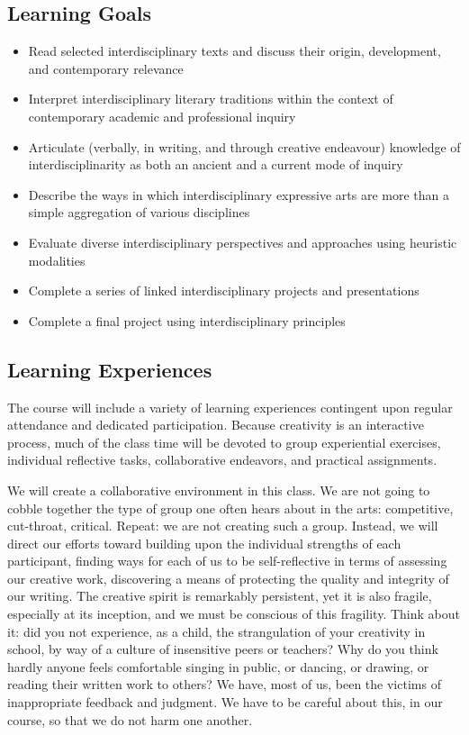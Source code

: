 \documentclass[letterpaper,10pt,headsepline]{scrreprt}
\begin{document}
\subsection{Learning Goals}
\begin{itemize}

\item Read selected interdisciplinary texts and discuss their origin, development, and contemporary relevance
\item Interpret interdisciplinary literary traditions within the context of contemporary academic and professional inquiry
\item Articulate (verbally, in writing, and through creative endeavour) knowledge of interdisciplinarity as both an ancient and a current mode of inquiry
\item Describe the ways in which interdisciplinary expressive arts are more than a simple aggregation of various disciplines
\item Evaluate diverse interdisciplinary perspectives and approaches using heuristic modalities
\item Complete a series of linked interdisciplinary projects and presentations
\item Complete a final project using interdisciplinary principles

\end{itemize}
\clearpage

\subsection{Learning Experiences}
The course will include a variety of learning experiences contingent upon regular attendance and dedicated participation. Because creativity is an interactive process, much of the class time will be devoted to group experiential exercises, individual reflective tasks, collaborative endeavors, and practical assignments.

We will create a collaborative environment in this class. We are not going to cobble together the type of group one often hears about in the arts: competitive, cut-throat, critical. Repeat: we are not creating such a group. Instead, we will direct our efforts toward building upon the individual strengths of each participant, finding ways for each of us to be self-reflective in terms of assessing our creative work, discovering a means of protecting the quality and integrity of our writing. The creative spirit is remarkably persistent, yet it is also fragile, especially at its inception, and
we must be conscious of this fragility. Think about it: did you not experience, as a child, the strangulation of your creativity in school, by way of a culture of insensitive peers or teachers? Why do you think hardly anyone feels comfortable singing in public, or dancing, or drawing, or reading their written work to others? We have, most of us, been the victims of inappropriate feedback and judgment. We have to be careful about this, in our course, so that we do not harm one another.
\end{document}
